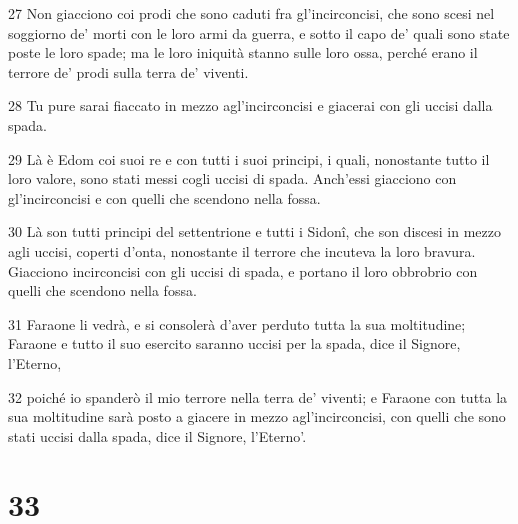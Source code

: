 \par 27 Non giacciono coi prodi che sono caduti fra gl'incirconcisi, che sono scesi nel soggiorno de' morti con le loro armi da guerra, e sotto il capo de' quali sono state poste le loro spade; ma le loro iniquità stanno sulle loro ossa, perché erano il terrore de' prodi sulla terra de' viventi.
\par 28 Tu pure sarai fiaccato in mezzo agl'incirconcisi e giacerai con gli uccisi dalla spada.
\par 29 Là è Edom coi suoi re e con tutti i suoi principi, i quali, nonostante tutto il loro valore, sono stati messi cogli uccisi di spada. Anch'essi giacciono con gl'incirconcisi e con quelli che scendono nella fossa.
\par 30 Là son tutti principi del settentrione e tutti i Sidonî, che son discesi in mezzo agli uccisi, coperti d'onta, nonostante il terrore che incuteva la loro bravura. Giacciono incirconcisi con gli uccisi di spada, e portano il loro obbrobrio con quelli che scendono nella fossa.
\par 31 Faraone li vedrà, e si consolerà d'aver perduto tutta la sua moltitudine; Faraone e tutto il suo esercito saranno uccisi per la spada, dice il Signore, l'Eterno,
\par 32 poiché io spanderò il mio terrore nella terra de' viventi; e Faraone con tutta la sua moltitudine sarà posto a giacere in mezzo agl'incirconcisi, con quelli che sono stati uccisi dalla spada, dice il Signore, l'Eterno'.

\chapter{33}

